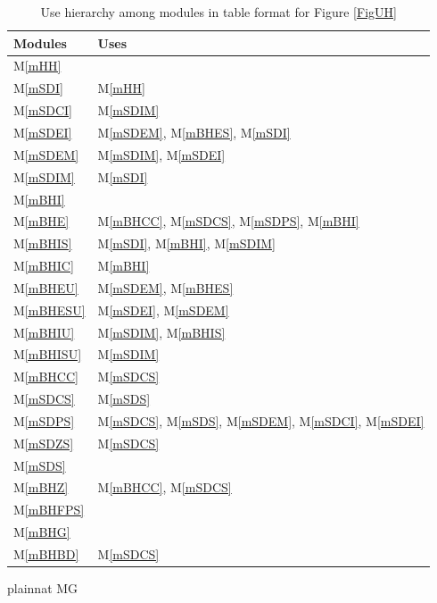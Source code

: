 \documentclass[12pt, titlepage]{article}
\newcommand{\mref}[1]{M\ref{#1}}
\begin{document}
\begin{table}[H]
\centering
\begin{tabular}{p{} p{}}
\toprule
\textbf{Modules} & \textbf{Uses}\\
\midrule
\mref{mHH} & ~\\
\mref{mSDI} & \mref{mHH}\\
\mref{mSDCI} & \mref{mSDIM}\\
\mref{mSDEI} & \mref{mSDEM}, \mref{mBHES}, \mref{mSDI}\\
\mref{mSDEM} & \mref{mSDIM}, \mref{mSDEI}\\
\mref{mSDIM} & \mref{mSDI}\\
\mref{mBHI} & ~\\
\mref{mBHE} & \mref{mBHCC}, \mref{mSDCS}, \mref{mSDPS}, \mref{mBHI}\\
\mref{mBHIS} & \mref{mSDI}, \mref{mBHI}, \mref{mSDIM}\\
\mref{mBHIC} & \mref{mBHI}\\
\mref{mBHEU} & \mref{mSDEM}, \mref{mBHES}\\
\mref{mBHESU} & \mref{mSDEI}, \mref{mSDEM}\\
\mref{mBHIU} & \mref{mSDIM}, \mref{mBHIS}\\
\mref{mBHISU} & \mref{mSDIM}\\
\mref{mBHCC} & \mref{mSDCS}\\
\mref{mSDCS} & \mref{mSDS}\\
\mref{mSDPS} & \mref{mSDCS}, \mref{mSDS}, \mref{mSDEM}, \mref{mSDCI}, \mref{mSDEI}\\
\mref{mSDZS} & \mref{mSDCS}\\
\mref{mSDS} & ~\\
\mref{mBHZ} & \mref{mBHCC}, \mref{mSDCS}\\
\mref{mBHFPS} & ~\\
\mref{mBHG} & ~\\
\mref{mBHBD} & \mref{mSDCS}\\
\bottomrule
\end{tabular}
\caption{Use hierarchy among modules in table format for Figure \ref{FigUH}}
\label{TblACT}
\end{table}


 {plainnat}
 {MG}
\end{document}
